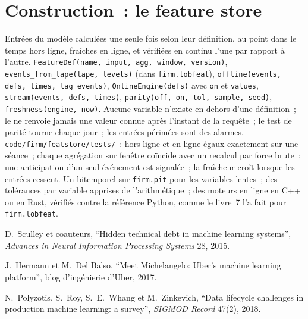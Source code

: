 \section{Construction~: le feature store}\label{bld:ml:data-and-feature-stores:featstore}

\begin{build}
 Entrées du modèle calculées une seule fois selon leur définition, au point dans le temps hors ligne, fraîches en ligne, et vérifiées en continu
l'une par rapport à l'autre.
 \texttt{FeatureDef(name, input, agg, window, version)}, \texttt{events\_from\_tape(tape, levels)} (dans
\texttt{firm.lobfeat}), \texttt{offline(events, defs, times, lag\_events)}, \texttt{OnlineEngine(defs)} avec \texttt{on} et
\texttt{values}, \texttt{stream(events, defs, times)}, \texttt{parity(off, on, tol, sample, seed)},
\texttt{freshness(engine, now)}.
 Aucune variable n'existe en dehors d'une définition~; le  ne renvoie jamais une valeur connue après l'instant de la requête~;
le test de parité tourne chaque jour~; les entrées périmées sont des alarmes.
 \texttt{code/firm/featstore/tests/}~: hors ligne et en ligne égaux exactement sur une séance~; chaque agrégation sur fenêtre
coïncide avec un recalcul par force brute~; une anticipation d'un seul événement est signalée~; la fraîcheur croît lorsque les entrées cessent.
 Un  bitemporel sur \texttt{firm.pit} pour les variables lentes~; des tolérances par variable apprises de
l'arithmétique~; des moteurs en ligne en C++ ou en Rust, vérifiés contre la référence Python, comme le livre~7 l'a fait pour \texttt{firm.lobfeat}.
\end{build}

\begin{omsources}
\item D.~Sculley et coauteurs, ``Hidden technical debt in machine learning systems'', \emph{Advances in Neural Information
Processing Systems} 28, 2015.
\item J.~Hermann et M.~Del Balso, ``Meet Michelangelo: Uber's machine learning platform'', blog d'ingénierie d'Uber, 2017.
\item N.~Polyzotis, S.~Roy, S.~E.~Whang et M.~Zinkevich, ``Data lifecycle challenges in production machine learning: a
survey'', \emph{SIGMOD Record} 47(2), 2018.
\end{omsources}

